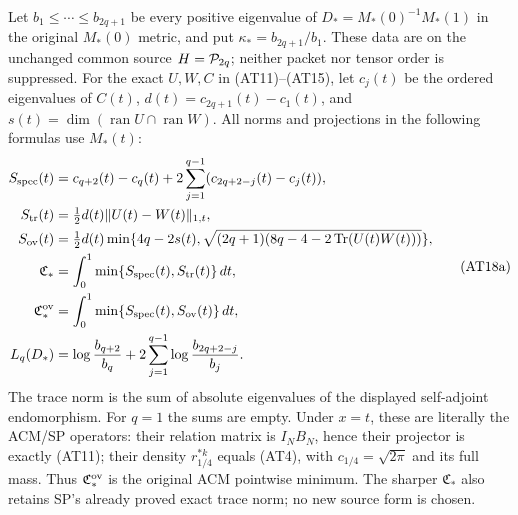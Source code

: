 Let $b_1\le\cdots\le b_{2q+1}$ be every positive eigenvalue of
$D_*=M_*(0)^{-1}M_*(1)$ in the original $M_*(0)$ metric, and put
$\kappa_*=b_{2q+1}/b_1$. These data are on the unchanged common
source $H=\mathcal P_{2q}$; neither packet nor tensor order is suppressed.
For the exact $U,W,C$ in (AT11)--(AT15), let $c_j(t)$ be the
ordered eigenvalues of $C(t)$, $d(t)=c_{2q+1}(t)-c_1(t)$, and
$s(t)=\dim(\operatorname{ran}U\cap\operatorname{ran}W)$. All norms
and projections in the following formulas use $M_*(t)$:
\[
\begin{aligned}
S_{\rm spec}(t)&=c_{q+2}(t)-c_q(t)
 +2\sum_{j=1}^{q-1}(c_{2q+2-j}(t)-c_j(t)),\\
S_{\rm tr}(t)&=\tfrac12d(t)\|U(t)-W(t)\|_{1,t},\\
S_{\rm ov}(t)&=\tfrac12d(t)\min\{4q-2s(t),
 \sqrt{(2q+1)(8q-4-2\operatorname{Tr}(U(t)W(t)))}\},\\
\mathfrak C_*&=\int_0^1\min\{S_{\rm spec}(t),S_{\rm tr}(t)\}\,dt,\\
\mathfrak C_*^{\rm ov}&=\int_0^1\min\{S_{\rm spec}(t),S_{\rm ov}(t)\}\,dt,\\
L_q(D_*)&=\log\frac{b_{q+2}}{b_q}
 +2\sum_{j=1}^{q-1}\log\frac{b_{2q+2-j}}{b_j}.
\end{aligned}\tag{AT18a}
\]
The trace norm is the sum of absolute eigenvalues of the displayed
self-adjoint endomorphism. For $q=1$ the sums are empty. Under
$x=t$, these are literally the ACM/SP operators: their relation
matrix is $I_NB_N$, hence their projector is exactly (AT11);
their density $r_{1/4}^{*k}$ equals (AT4), with
$c_{1/4}=\sqrt{2\pi}$ and its full mass. Thus
$\mathfrak C_*^{\rm ov}$ is the original ACM pointwise minimum.
The sharper $\mathfrak C_*$ also retains SP's already proved exact
trace norm; no new source form is chosen.

